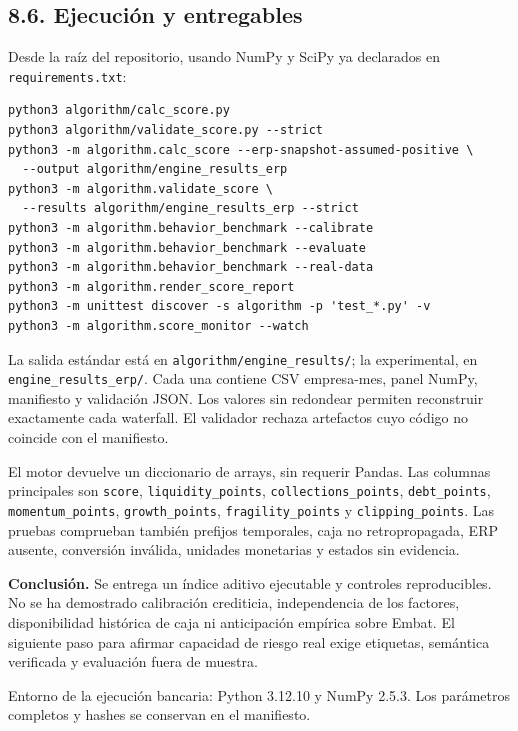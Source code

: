 \subsection*{8.6. Ejecución y entregables}
Desde la raíz del repositorio, usando NumPy y SciPy ya declarados en \texttt{requirements.txt}:
\begin{verbatim}
python3 algorithm/calc_score.py
python3 algorithm/validate_score.py --strict
python3 -m algorithm.calc_score --erp-snapshot-assumed-positive \
  --output algorithm/engine_results_erp
python3 -m algorithm.validate_score \
  --results algorithm/engine_results_erp --strict
python3 -m algorithm.behavior_benchmark --calibrate
python3 -m algorithm.behavior_benchmark --evaluate
python3 -m algorithm.behavior_benchmark --real-data
python3 -m algorithm.render_score_report
python3 -m unittest discover -s algorithm -p 'test_*.py' -v
python3 -m algorithm.score_monitor --watch
\end{verbatim}
La salida estándar está en \texttt{algorithm/engine\_results/}; la experimental, en \texttt{engine\_results\_erp/}. Cada una contiene CSV empresa-mes, panel NumPy, manifiesto y validación JSON. Los valores sin redondear permiten reconstruir exactamente cada waterfall. El validador rechaza artefactos cuyo código no coincide con el manifiesto.

El motor devuelve un diccionario de arrays, sin requerir Pandas. Las columnas principales son \texttt{score}, \texttt{liquidity\_points}, \texttt{collections\_points}, \texttt{debt\_points}, \texttt{momentum\_points}, \texttt{growth\_points}, \texttt{fragility\_points} y \texttt{clipping\_points}. Las pruebas comprueban también prefijos temporales, caja no retropropagada, ERP ausente, conversión inválida, unidades monetarias y estados sin evidencia.

\textbf{Conclusión.} Se entrega un índice aditivo ejecutable y controles reproducibles. No se ha demostrado calibración crediticia, independencia de los factores, disponibilidad histórica de caja ni anticipación empírica sobre Embat. El siguiente paso para afirmar capacidad de riesgo real exige etiquetas, semántica verificada y evaluación fuera de muestra.

Entorno de la ejecución bancaria: Python 3.12.10 y NumPy 2.5.3. Los parámetros completos y hashes se conservan en el manifiesto.
